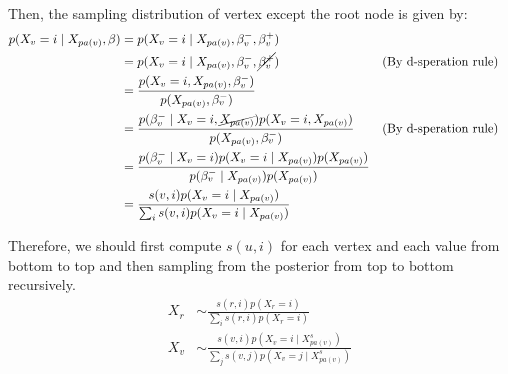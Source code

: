 \documentclass[12pt]{article}
\newenvironment{problem}[2][Problem]{\begin{trivlist}
\item[\hskip \labelsep {\bfseries #1}\hskip \labelsep {\bfseries #2.}]}{\end{trivlist}}
\begin{document}
\begin{problem}{2.5.15}
Then, the sampling distribution of vertex except the root node is given by:
\begin{align*}
    p(X_v = i\mid X_{pa(v)}, \beta) 
    &= p(X_v = i\mid X_{pa(v)}, \beta^{-}_{v}, \beta^{+}_{v}) \\
    &= p(X_v = i\mid X_{pa(v)}, \beta^{-}_{v}, \cancel{\beta^{+}_{v}}) && \text{(By d-speration rule)}\\
    &= \frac{p(X_v = i, X_{pa(v)}, \beta^{-}_{v})}{p(X_{pa(v)}, \beta^{-}_{v})} \\
    &= \frac{p(\beta^{-}_{v}\mid X_v = i, \cancel{X_{pa(v)}})p(X_v = i, X_{pa(v)})}
        {p(X_{pa(v)}, \beta^{-}_{v})} && \text{(By d-speration rule)}\\
    &= \frac{p(\beta^{-}_{v}\mid X_v = i)p(X_v = i\mid X_{pa(v)})p(X_{pa(v)})}
        {p(\beta^{-}_{v}\mid X_{pa(v)})p(X_{pa(v)})} \\
    &= \frac{s(v,i)p(X_v = i\mid X_{pa(v)})}
            {\sum_{i}s(v,i)p(X_v = i\mid X_{pa(v)})}
\end{align*}

Therefore, we should first compute $s(u, i)$ for each vertex and each value 
from bottom to top and then sampling from the posterior from top to bottom
recursively.
\begin{align}
    X_r &\sim \frac{s(r,i)p(X_r =i)}{\sum_{i}s(r,i)p(X_r =i)} \\
    X_v &\sim \frac{s(v,i)p(X_v = i\mid X_{pa(v)}^{s})}
                {\sum_{j}s(v,j)p(X_v = j\mid X_{pa(v)}^{s})}
\end{align}
\end{problem}
\pagebreak
\end{document}
